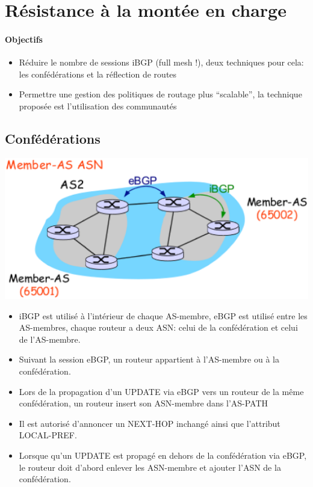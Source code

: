 \documentclass{report}
\begin{document}
\section{Résistance à la montée en charge}

\paragraph{Objectifs}

\begin{itemize}
\item Réduire le nombre de sessions iBGP (full mesh !), deux
  techniques pour cela: les confédérations et la réflection de routes
\item Permettre une gestion des politiques de routage plus
  ``scalable'', la technique proposée est l'utilisation des
  communautés
\end{itemize}

\subsection{Confédérations}

\includegraphics[width=\textwidth]{confederations.eps}

\begin{itemize}
\item iBGP est utilisé à l'intérieur de chaque AS-membre, eBGP est
  utilisé entre les AS-membres, chaque routeur a deux ASN: celui de la
  confédération et celui de l'AS-membre.
\item Suivant la session eBGP, un routeur appartient à l'AS-membre ou
  à la confédération.
\item Lors de la propagation d'un UPDATE via eBGP vers un routeur de
  la même confédération, un routeur insert son ASN-membre dans
  l'AS-PATH
\item Il est autorisé d'annoncer un NEXT-HOP inchangé ainsi que
  l'attribut LOCAL-PREF.
\item Lorsque qu'un UPDATE est propagé en dehors de la confédération
  via eBGP, le routeur doit d'abord enlever les ASN-membre et ajouter
  l'ASN de la confédération.
\end{itemize}
\end{document}
